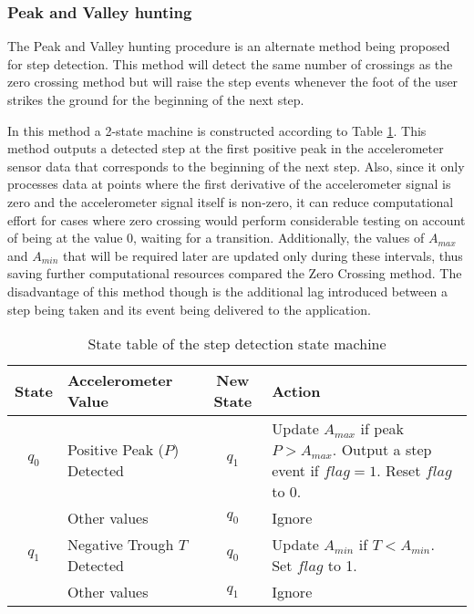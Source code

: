 \subsubsection{Peak and Valley hunting\label{sec:peak_and_valley}}

The Peak and Valley hunting procedure is an alternate method being
proposed for step detection.
This method will detect the same number of crossings as the zero crossing 
method but will raise the step events whenever the foot of the user 
strikes the ground for the beginning of the next step. 

In this method a 2-state machine is constructed according to Table
\ref{tbl:peak_valley_state_table}. This method outputs a detected step at 
the first positive peak in the accelerometer sensor data that corresponds to 
the beginning of the next step. Also, since it only processes data at 
points where the first derivative of the accelerometer signal is zero and 
the accelerometer signal itself is non-zero, it can reduce computational 
effort for cases where zero crossing would perform considerable testing
on account of being at the value 0, waiting for a transition. Additionally,
the values of $A_{max}$ and $A_{min}$ that will be required later are 
updated only during these intervals, thus saving further computational 
resources compared the Zero Crossing method. The disadvantage of this method
though is the additional lag introduced between a step being taken and its 
event being delivered to the application.

\begin{table}[h]\centering
    \begin{tabular}{c p{2in} c p{3in}} \hline
    State & Accelerometer Value     & New State &  Action\\     \hline
    $q_0$ & Positive Peak ($P$) Detected  & $q_1$     & Update $A_{max}$ if peak $P > A_{max}$. Output a step event if $flag = 1$. Reset $flag$ to 0.  \\ 
          & Other values            & $q_0$     & Ignore \\         \hline
    $q_1$ & Negative Trough $T$ Detected & $q_0$    & Update $A_{min}$ if $T < A_{min}$. Set $flag$ to 1. \\
          & Other values            & $q_1$     & Ignore \\ \hline
    \end{tabular}
    \caption{State table of the step detection state machine\label{tbl:peak_valley_state_table}}
\end{table}

